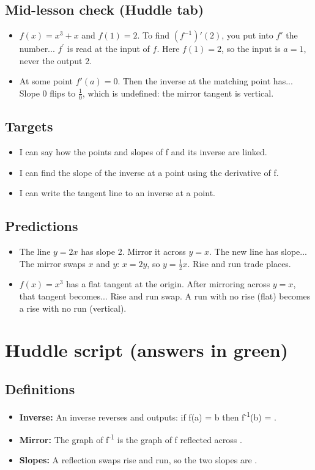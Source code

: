 \documentclass[11pt]{article}
\begin{document}
\subsection*{Mid-lesson check (Huddle tab)}\begin{itemize}
\item $f(x)=x^3+x$ and $f(1)=2$. To find $(f^{-1})'(2)$, you put into $f'$ the number...  $f^{\prime}$ is read at the input of $f$. Here $f(1)=2$, so the input is $a=1$, never the output 2.
\item At some point $f'(a)=0$. Then the inverse at the matching point has...  Slope $0$ flips to $\tfrac10$, which is undefined: the mirror tangent is vertical.
\end{itemize}
\subsection*{Targets}\begin{itemize}\item I can say how the points and slopes of f and its inverse are linked.
\item I can find the slope of the inverse at a point using the derivative of f.
\item I can write the tangent line to an inverse at a point.\end{itemize}
\subsection*{Predictions}\begin{itemize}
\item The line $y=2x$ has slope 2. Mirror it across $y=x$. The new line has slope...  The mirror swaps $x$ and $y$: $x=2y$, so $y=\tfrac12x$. Rise and run trade places.
\item $f(x)=x^3$ has a flat tangent at the origin. After mirroring across $y=x$, that tangent becomes...  Rise and run swap. A run with no rise (flat) becomes a rise with no run (vertical).
\end{itemize}
\section*{Huddle script (answers in green)}
\subsection*{Definitions}\begin{itemize}
\item \textbf{Inverse:} An inverse reverses  and outputs: if f(a) = b then f\textsuperscript{-1}(b) = .
\item \textbf{Mirror:} The graph of f\textsuperscript{-1} is the graph of f reflected across .
\item \textbf{Slopes:} A reflection swaps rise and run, so the two slopes are .
\end{itemize}
\end{document}
